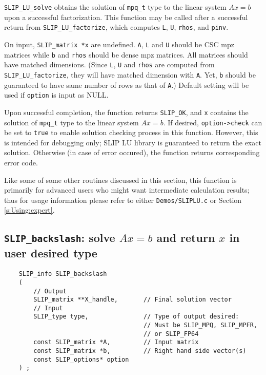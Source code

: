 \documentclass[12pt]{article}
\theoremstyle{definition}
\begin{document}
\verb|SLIP_LU_solve| obtains the solution of \verb|mpq_t| type to the linear
system $Ax=b$ upon a successful factorization.  This function may be called
after a successful return from \verb|SLIP_LU_factorize|, which computes
\verb|L|, \verb|U|, \verb|rhos|, and \verb|pinv|. 

On input, \verb|SLIP_matrix *x| are undefined. \verb|A|, \verb|L| and \verb|U|
should be CSC mpz matrices while \verb|b| and \verb|rhos| should be dense mpz
matrices. All matrices should have matched dimensions. (Since \verb|L|, \verb|U|
and \verb|rhos| are computed from \verb|SLIP_LU_factorize|, they will have
matched dimension with \verb|A|. Yet, \verb|b| should be guaranteed to have
same number of rows as that of \verb|A|.) Default setting will be used if
\verb|option| is input as NULL.

Upon successful completion, the function returns \verb|SLIP_OK|, and
\verb|x| contains the solution of \verb|mpq_t| type to the
linear system $Ax=b$. If desired, \verb|option->check|
can be set to \verb|true| to enable solution checking process in this function.
However, this is intended for debugging only; SLIP LU library is guaranteed to
return the exact solution. Otherwise (in case of error occured), the function
returns corresponding error code.

Like some of some other routines discussed in this section, this
function is primarily for advanced users who might want intermediate
calculation results; thus for usage information please refer to either
\verb|Demos/SLIPLU.c| or Section \ref{s:Using:expert}.


\cprotect\subsection{\verb|SLIP_backslash|: solve $Ax=b$ and return $x$ in user desired type}
\label{ss:SLIP_backslash}

\begin{mdframed}[userdefinedwidth=6in]
{\footnotesize
\begin{verbatim}
    SLIP_info SLIP_backslash
    (
        // Output
        SLIP_matrix **X_handle,       // Final solution vector
        // Input
        SLIP_type type,               // Type of output desired:
                                      // Must be SLIP_MPQ, SLIP_MPFR,
                                      // or SLIP_FP64
        const SLIP_matrix *A,         // Input matrix
        const SLIP_matrix *b,         // Right hand side vector(s)
        const SLIP_options* option
    ) ;
\end{verbatim}
} \end{mdframed}
\end{document}
